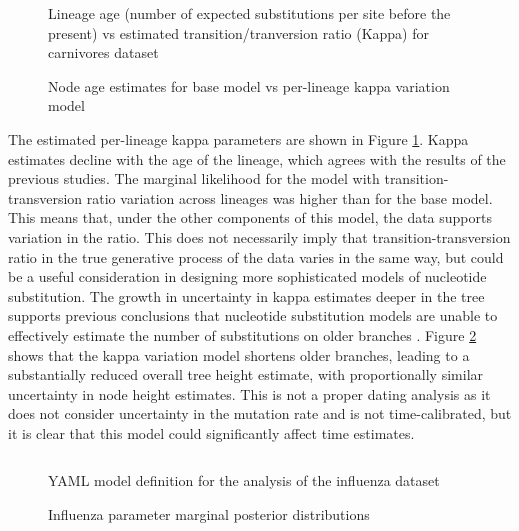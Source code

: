 \begin{figure}
    \centering
    \caption{Lineage age (number of expected substitutions per site before the present) vs estimated transition/tranversion ratio (Kappa) for carnivores dataset}
    \label{fig:carnivoreskappa}
\end{figure}

\begin{figure}
    \centering
    \caption{Node age estimates for base model vs per-lineage kappa variation model}
    \label{fig:carnivorestree}
\end{figure}

The estimated per-lineage kappa parameters are shown in Figure \ref{fig:carnivoreskappa}. Kappa estimates decline with the age of the lineage, which agrees with the results of the previous studies. The marginal likelihood for the model with transition-transversion ratio variation across lineages was higher than for the base model. This means that, under the other components of this model, the data supports variation in the ratio. This does not necessarily imply that transition-transversion ratio in the true generative process of the data varies in the same way, but could be a useful consideration in designing more sophisticated models of nucleotide substitution. The growth in uncertainty in kappa estimates deeper in the tree supports previous conclusions that nucleotide substitution models are unable to effectively estimate the number of substitutions on older branches \cite{duchene2015declining}. Figure \ref{fig:carnivorestree} shows that the kappa variation model shortens older branches, leading to a substantially reduced overall tree height estimate, with proportionally similar uncertainty in node height estimates. This is not a proper dating analysis as it does not consider uncertainty in the mutation rate and is not time-calibrated, but it is clear that this model could significantly affect time estimates.

\begin{figure}

    \inputminted{yaml}{\VAR{ flu_yaml_file }}

    \caption{YAML model definition for the analysis of the influenza dataset}
    \label{fig:fluyaml}
\end{figure}

\begin{figure}
    \centering
    \caption{Influenza parameter marginal posterior distributions}
    \label{fig:flumarginals}
\end{figure}

